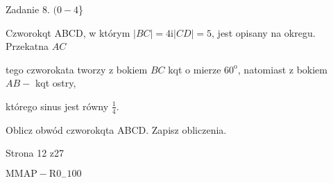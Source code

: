 \documentclass[a4paper,12pt]{article}
\begin{document}
Zadanie 8. $(0-4$\}

Czworokqt ABCD, w którym $|BC|=4 \mathrm{i} |CD|=5$, jest opisany na okregu. Przekatna $AC$

tego czworokata tworzy z bokiem $BC$ kqt o mierze $60^{\mathrm{o}}$, natomiast z bokiem $AB-$ kqt ostry,

którego sinus jest równy $\displaystyle \frac{1}{4}.$

Oblicz obwód czworokqta ABCD. Zapisz obliczenia.

Strona 12 z27

$\mathrm{M}\mathrm{M}\mathrm{A}\mathrm{P}-\mathrm{R}0_{-}100$
\end{document}
